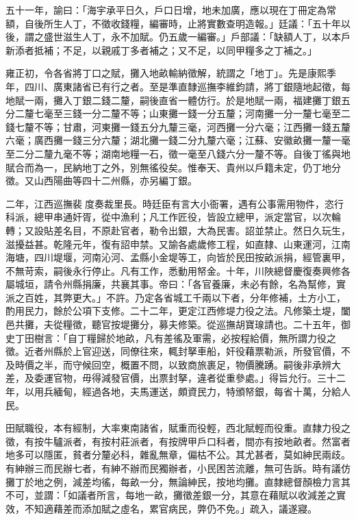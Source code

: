 \begin{pinyinscope}
五十一年，諭曰：「海宇承平日久，戶口日增，地未加廣，應以現在丁冊定為常額，自後所生人丁，不徵收錢糧，編審時，止將實數查明造報。」廷議：「五十年以後，謂之盛世滋生人丁，永不加賦。仍五歲一編審。」戶部議：「缺額人丁，以本戶新添者抵補；不足，以親戚丁多者補之；又不足，以同甲糧多之丁補之。」

雍正初，令各省將丁口之賦，攤入地畝輸納徵解，統謂之「地丁」。先是康熙季年，四川、廣東諸省已有行之者。至是準直隸巡撫李維鈞請，將丁銀隨地起徵，每地賦一兩，攤入丁銀二錢二釐，嗣後直省一體仿行。於是地賦一兩，福建攤丁銀五分二釐七毫至三錢一分二釐不等；山東攤一錢一分五釐；河南攤一分一釐七毫至二錢七釐不等；甘肅，河東攤一錢五分九釐三毫，河西攤一分六毫；江西攤一錢五釐六毫；廣西攤一錢三分六釐；湖北攤一錢二分九釐六毫；江蘇、安徽畝攤一釐一毫至二分二釐九毫不等；湖南地糧一石，徵一毫至八錢六分一釐不等。自後丁徭與地賦合而為一，民納地丁之外，別無徭役矣。惟奉天、貴州以戶籍未定，仍丁地分徵。又山西陽曲等四十二州縣，亦另編丁銀。

二年，江西巡撫裴度奏裁里長。時廷臣有言大小衙署，遇有公事需用物件，恣行科派，總甲串通奸胥，從中漁利；凡工作匠役，皆設立總甲，派定當官，以次輪轉；又設貼差名目，不原赴官者，勒令出銀，大為民害。詔並禁止。然日久玩生，滋擾益甚。乾隆元年，復有詔申禁。又諭各處歲修工程，如直隸、山東運河，江南海塘，四川堤堰，河南沁河、孟縣小金堤等工，向皆於民田按畝派捐，經管裏甲，不無苛索，嗣後永行停止。凡有工作，悉動用帑金。十年，川陜總督慶復奏興修各屬城垣，請令州縣捐廉，共襄其事。帝曰：「各官養廉，未必有餘，名為幫修，實派之百姓，其弊更大。」不許。乃定各省城工千兩以下者，分年修補，土方小工，酌用民力，餘於公項下支修。二十二年，更定江西修堤力役之法。凡修築土堤，闔邑共攤，夫從糧徵，聽官按堤攤分，募夫修築。從巡撫胡寶瑔請也。二十五年，御史丁田樹言：「自丁糧歸於地畝，凡有差徭及軍需，必按程給價，無所謂力役之徵。近者州縣於上官迎送，同僚往來，輒封拏車船，奸役藉票勒派，所發官價，不及時價之半，而守候回空，概置不問，以致商旅裹足，物價騰踴。嗣後非承辨大差，及委運官物，毋得減發官價，出票封拏，違者從重參處。」得旨允行。三十二年，以用兵緬甸，經過各地，夫馬運送，頗資民力，特頒帑銀，每省十萬，分給人民。

田賦職役，本有經制，大率東南諸省，賦重而役輕，西北賦輕而役重。直隸力役之徵，有按牛驢派者，有按村莊派者，有按牌甲戶口科者，間亦有按地畝者。然富者地多可以隱匿，貧者分釐必科，雜亂無章，偏枯不公。其尤甚者，莫如紳民兩歧。有紳辦三而民辦七者，有紳不辦而民獨辦者，小民困苦流離，無可告訴。時有議仿攤丁於地之例，減差均徭，每畝一分，無論紳民，按地均攤。直隸總督顏檢力言其不可，並謂：「如議者所言，每地一畝，攤徵差銀一分，其意在藉賦以收減差之實效，不知適藉差而添加賦之虛名，累官病民，弊仍不免。」疏入，議遂寢。


\end{pinyinscope}
